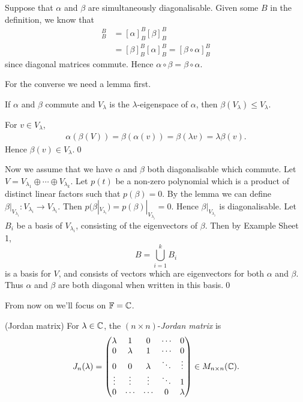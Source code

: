 \documentclass{article}
\newcommand{\F}{\mathbb{F}}
\begin{document}
\pf Suppose that $ \alpha $ and $ \beta $ are simultaneously diagonalisable. Given some $ B $ in the definition, we know that
\begin{align*}
	[\alpha\circ\beta]^B_B &=[\alpha]^B_B[\beta]^B_B\\
			       &= [\beta]^B_B[\alpha]^B_B=[\beta\circ\alpha]^B_B
\end{align*}
since diagonal matrices commute. Hence $ \alpha\circ\beta=\beta\circ\alpha $.\par
For the converse we need a lemma first.
\begin{lemma}
  If $ \alpha $ and $ \beta $ commute and $ V_\lambda $ is the $ \lambda $-eigenspace of $ \alpha $, then $ \beta(V_\lambda)\le V_\lambda $.
\end{lemma}
\pf For $ v\in V_\lambda $,
\begin{align*}
  \alpha(\beta(V))=\beta(\alpha(v))=\beta(\lambda v)=\lambda\beta(v).
\end{align*}
Hence $ \beta(v)\in V_\lambda $.\qed\par
Now we assume that we have $ \alpha $ and $ \beta $ both diagonalisable which commute. Let $ V=V_{\lambda_1}\oplus \cdots \oplus V_{\lambda_k} $. Let $ p(t) $ be a non-zero polynomial which is a product of distinct linear factors such that $ p(\beta)=0 $. By the lemma we can define $ \beta|_{V_{\lambda_i}}: V_{\lambda_i}\to V_{\lambda_i} $. Then $ p(\beta|_{V_{\lambda_i}})=p(\beta)|_{V_{\lambda_i}}=0 $. Hence $ \beta|_{V_{\lambda_i}} $ is diagonalisable. Let $ B_i $ be a basis of $ V_{\lambda_i} $, consisting of the eigenvectors of $ \beta $. Then by Example Sheet 1,
\[
	B=\bigcup_{i=1}^k B_i
\]
is a basis for $ V $, and consists of vectors which are eigenvectors for both $ \alpha $ and $ \beta $. Thus $ \alpha $ and $ \beta $ are both diagonal when written in this basis.\qed
\par
From now on we'll focus on $ \F=\C $.
\begin{definition}
	(Jordan matrix) For $ \lambda\in \mathbb{C} $, the $ (n\times n) $-\textit{Jordan matrix} is
	\[
	  J_n(\lambda) = \begin{pmatrix}
			  \lambda & 1 & 0 & \cdots & 0\\
			  0 & \lambda & 1 & \cdots & 0\\
			  0 & 0 & \lambda & \ddots & \vdots\\
			  \vdots &\vdots & \vdots & \ddots & 1 \\
			  0 & \cdots & \cdots & 0 & \lambda
		  \end{pmatrix}\in M_{n\times n}(\mathbb{C}). 
	\]
\end{definition}
\end{document}
